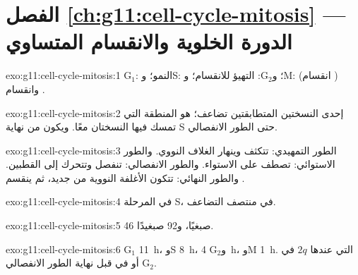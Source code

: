\section*{الفصل \ref{ch:g11:cell-cycle-mitosis} --- الدورة الخلوية والانقسام المتساوي}

\begin{solution}{exo:g11:cell-cycle-mitosis:1}
$\mathrm{G_1}$: النمو؛ وS: ؛ و$\mathrm{G_2}$: التهيؤ
للانقسام؛ وM:  (انقسام ) وانقسام .
\end{solution}

\begin{solution}{exo:g11:cell-cycle-mitosis:2}
 إحدى النسختين المتطابقتين  تضاعف؛  هو
المنطقة التي تمسك فيها النسختان معًا. ويكون   من نهاية S
حتى الطور الانفصالي.
\end{solution}

\begin{solution}{exo:g11:cell-cycle-mitosis:3}
الطور التمهيدي: تتكثف  وينهار الغلاف النووي. والطور الاستوائي:
تصطف  على الاستواء. والطور الانفصالي: تنفصل  وتتحرك
إلى القطبين. والطور النهائي: تتكون الأغلفة النووية من جديد، ثم ينقسم
.
\end{solution}

\begin{solution}{exo:g11:cell-cycle-mitosis:4}
في المرحلة S، في منتصف التضاعف.
\end{solution}

\begin{solution}{exo:g11:cell-cycle-mitosis:5}
46 صبغيًا، و92 صبغيدًا.
\end{solution}

\begin{solution}{exo:g11:cell-cycle-mitosis:6}
$\mathrm{G_1}$ \qty{11}{h}، وS \qty{8}{h}، و$\mathrm{G_2}$ \qty{4}{h}،
وM \qty{1}{h}.  التي عندها $2q$ في $\mathrm{G_2}$ أو في
 قبل نهاية الطور الانفصالي.
\end{solution}

